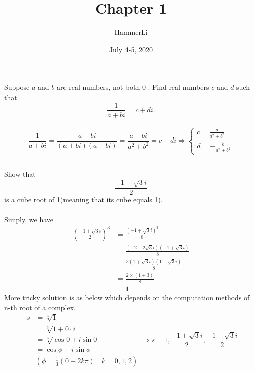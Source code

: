 \documentclass[a4paper]{article}
\title{Chapter 1}
\author{HammerLi}
\date{July 4-5, 2020}
\begin{document}
\maketitle

\section{}
\subsection{}
Suppose $a$ and $b$ are real numbers, not both $0$ . Find real numbers $c$ and $d$ such that
$$
    \frac{1}{a+bi} = c+di.
$$
\paragraph{}
$$
    \frac{1}{a+bi} = \frac{a-bi}{(a+bi)(a-bi)} = \frac{a-bi}{a^2+b^2} = c+di
    \Rightarrow \begin{cases}
        c = \frac{a}{a^2+b^2} \\
        d = -\frac{b}{a^2+b^2}
    \end{cases}
$$

\subsection{}
Show that
$$
    \frac{-1+\sqrt{3}i}{2}
$$
is a cube root of 1(meaning that its cube equals 1).
\paragraph{}
Simply, we have
$$
    \begin{aligned}
        (\frac{-1+\sqrt{3}i}{2})^3
         & = \frac{(-1+\sqrt{3}i)^3}{8}              \\
         & = \frac{(-2-2\sqrt{3}i)(-1+\sqrt{3}i)}{8} \\
         & = \frac{2(1+\sqrt{3}i)(1-\sqrt{3}i)}{8}   \\
         & = \frac{2 \times (1+3)}{8}                \\
         & = 1
    \end{aligned}
$$
More tricky solution is as below which depends on the computation methods of n-th root of a complex.
$$
    \begin{aligned}
        s & = \sqrt[3]{1}                                   \\
          & = \sqrt[3]{1+0 \cdot i}                         \\
          & = \sqrt[3]{\cos{0}+i\sin{0}}                    \\
          & = \cos{\phi}+i\sin{\phi}                        \\
          & (\phi = \frac{1}{3}(0+2k\pi) \quad k = 0, 1, 2)
    \end{aligned}
    \Rightarrow s = 1, \frac{-1+\sqrt{3}i}{2}, \frac{-1-\sqrt{3}i}{2}
$$
\end{document}
